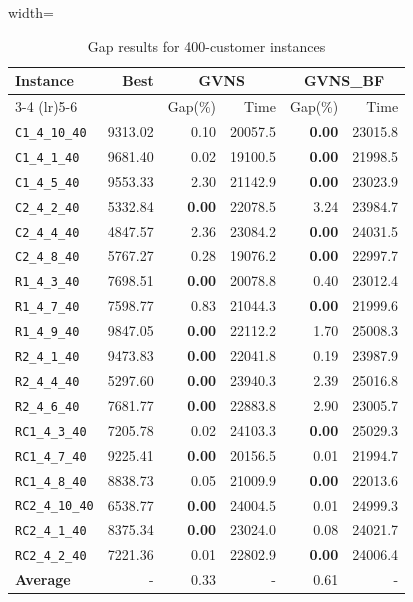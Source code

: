 \begin{table}[ht]
\centering
\small
\setlength{\tabcolsep}{5pt}
\caption{Gap results for 400-customer instances}
\vspace{4mm}
\begin{adjustbox}{width=\textwidth}
\begin{tabular}{l r r r @{\hspace{8pt}} r r @{\hspace{8pt}}}
\toprule
\multirow{2}{*}{Instance} & \multirow{2}{*}{Best} & \multicolumn{2}{c}{GVNS} & \multicolumn{2}{c}{GVNS\_BF} \\
\cmidrule(lr){3-4} \cmidrule(lr){5-6}
 &  & Gap(\%) & Time & Gap(\%) & Time \\
\midrule
\texttt{C1\_4\_10\_40} & 9313.02 & 0.10 & 20057.5 & \textbf{0.00} & 23015.8 \\
\texttt{C1\_4\_1\_40} & 9681.40 & 0.02 & 19100.5 & \textbf{0.00} & 21998.5 \\
\texttt{C1\_4\_5\_40} & 9553.33 & 2.30 & 21142.9 & \textbf{0.00} & 23023.9 \\
\texttt{C2\_4\_2\_40} & 5332.84 & \textbf{0.00} & 22078.5 & 3.24 & 23984.7 \\
\texttt{C2\_4\_4\_40} & 4847.57 & 2.36 & 23084.2 & \textbf{0.00} & 24031.5 \\
\texttt{C2\_4\_8\_40} & 5767.27 & 0.28 & 19076.2 & \textbf{0.00} & 22997.7 \\
\texttt{R1\_4\_3\_40} & 7698.51 & \textbf{0.00} & 20078.8 & 0.40 & 23012.4 \\
\texttt{R1\_4\_7\_40} & 7598.77 & 0.83 & 21044.3 & \textbf{0.00} & 21999.6 \\
\texttt{R1\_4\_9\_40} & 9847.05 & \textbf{0.00} & 22112.2 & 1.70 & 25008.3 \\
\texttt{R2\_4\_1\_40} & 9473.83 & \textbf{0.00} & 22041.8 & 0.19 & 23987.9 \\
\texttt{R2\_4\_4\_40} & 5297.60 & \textbf{0.00} & 23940.3 & 2.39 & 25016.8 \\
\texttt{R2\_4\_6\_40} & 7681.77 & \textbf{0.00} & 22883.8 & 2.90 & 23005.7 \\
\texttt{RC1\_4\_3\_40} & 7205.78 & 0.02 & 24103.3 & \textbf{0.00} & 25029.3 \\
\texttt{RC1\_4\_7\_40} & 9225.41 & \textbf{0.00} & 20156.5 & 0.01 & 21994.7 \\
\texttt{RC1\_4\_8\_40} & 8838.73 & 0.05 & 21009.9 & \textbf{0.00} & 22013.6 \\
\texttt{RC2\_4\_10\_40} & 6538.77 & \textbf{0.00} & 24004.5 & 0.01 & 24999.3 \\
\texttt{RC2\_4\_1\_40} & 8375.34 & \textbf{0.00} & 23024.0 & 0.08 & 24021.7 \\
\texttt{RC2\_4\_2\_40} & 7221.36 & 0.01 & 22802.9 & \textbf{0.00} & 24006.4 \\
\midrule
\textbf{Average} & - & 0.33 & - & 0.61 & - \\
\bottomrule
\end{tabular}
\end{adjustbox}
\end{table}
